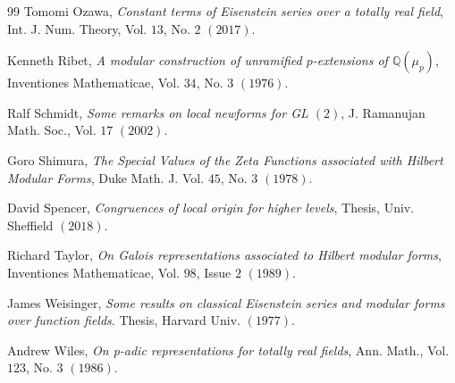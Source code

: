 \begin{thebibliography}{99}
Tomomi Ozawa, \emph{Constant terms of Eisenstein series over a totally real field}, Int. J. Num. Theory, Vol. $13$, No. $2$ $(2017)$.

Kenneth Ribet, \emph{A modular construction of unramified $p$-extensions of $\mathbb{Q}(\mu_p)$}, Inventiones Mathematicae, Vol. $34$, No. $3$ $(1976)$. 

Ralf Schmidt, \emph{Some remarks on local newforms for GL $(2)$}, J. Ramanujan Math. Soc., Vol. $17$ $(2002)$.

Goro Shimura, \emph{The Special Values of the Zeta Functions associated with Hilbert Modular Forms}, Duke Math. J.
Vol. $45$, No. $3$ $(1978)$.

David Spencer, \emph{Congruences of local origin for higher levels}, Thesis, Univ. Sheffield $(2018)$.

Richard Taylor, \emph{On Galois representations associated to Hilbert modular forms}, Inventiones Mathematicae, Vol. $98$, Issue $2$ $(1989)$.

James Weisinger, \emph{Some results on classical Eisenstein series and modular forms over function fields}.
Thesis, Harvard Univ. $(1977)$.

Andrew Wiles, \emph{On p-adic representations for totally real fields}, Ann. Math., Vol. $123$, No. $3$ $(1986)$.

\end{thebibliography}
